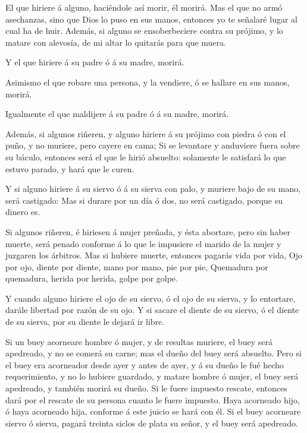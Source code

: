  El que hiriere á alguno, haciéndole así morir, él morirá.
 Mas el que no armó asechanzas, sino que Dios lo puso en
sus manos, entonces yo te señalaré lugar al cual ha de huir.
 Además, si alguno se ensoberbeciere contra su prójimo, y
lo matare con alevosía, de mi altar lo quitarás para que muera.

 Y el que hiriere á su padre ó á su madre, morirá.

 Asimismo el que robare una persona, y la vendiere, ó se
hallare en sus manos, morirá.

 Igualmente el que maldijere á su padre ó á su madre,
morirá.

 Además, si algunos riñeren, y alguno hiriere á su prójimo
con piedra ó con el puño, y no muriere, pero cayere en cama;
 Si se levantare y anduviere fuera sobre su báculo,
entonces será el que le hirió absuelto: solamente le satisfará lo que
estuvo parado, y hará que le curen.

 Y si alguno hiriere á su siervo ó á su sierva con palo, y
muriere bajo de su mano, será castigado:  Mas si durare por
un día ó dos, no será castigado, porque su dinero es.

 Si algunos riñeren, é hiriesen á mujer preñada, y ésta
abortare, pero sin haber muerte, será penado conforme á lo que le
impusiere el marido de la mujer y juzgaren los árbitros. 
Mas si hubiere muerte, entonces pagarás vida por vida,  Ojo
por ojo, diente por diente, mano por mano, pie por pie, 
Quemadura por quemadura, herida por herida, golpe por golpe.

 Y cuando alguno hiriere el ojo de su siervo, ó el ojo de
su sierva, y lo entortare, darále libertad por razón de su ojo.
 Y si sacare el diente de su siervo, ó el diente de su
sierva, por su diente le dejará ir libre.

 Si un buey acorneare hombre ó mujer, y de resultas
muriere, el buey será apedreado, y no se comerá su carne; mas el dueño
del buey será absuelto.  Pero si el buey era acorneador
desde ayer y antes de ayer, y á su dueño le fué hecho requerimiento, y
no lo hubiere guardado, y matare hombre ó mujer, el buey será apedreado,
y también morirá su dueño.  Si le fuere impuesto rescate,
entonces dará por el rescate de su persona cuanto le fuere impuesto.
 Haya acorneado hijo, ó haya acorneado hija, conforme á
este juicio se hará con él.  Si el buey acorneare siervo ó
sierva, pagará treinta siclos de plata su señor, y el buey será
apedreado.

